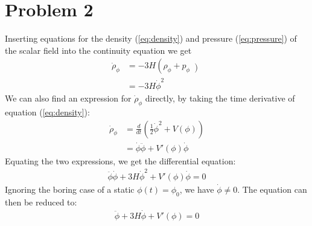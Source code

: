 \documentclass[reprint,english,notitlepage]{revtex4-1}  %
\begin{document}
\section{Problem 2}
Inserting equations for the density (\ref{eq:density}) and pressure
(\ref{eq:pressure}) of the scalar field into the continuity equation we get
\begin{align}
	\dot{\rho}_\phi &= -3H\left(\rho_\phi + p_\phi \left) \\
									&= -3H\dot{\phi}^2
\end{align}
We can also find an expression for $\dot{\rho}_\phi$ directly, by taking the
time derivative of equation (\ref{eq:density}):
\begin{align}
	\dot{\rho}_\phi &= \frac{d}{dt}\left(\frac{1}{2} \dot{\phi}^2 + V(\phi) \right)\\
					  			&= \dot{\phi} \ddot{\phi} + {V}'(\phi) \dot{\phi}
\end{align}
Equating the two expressions, we get the differential equation:
\begin{align}
	\ddot{\phi}\dot{\phi}  + 3H\dot{\phi}^2 + {V}'(\phi) \dot{\phi} = 0
\end{align}
Ignoring the boring case of a static $\phi(t)=\phi_0$, we have $\dot{\phi} \neq0$.
The equation can then be reduced to:
\begin{align}
	\ddot{\phi} + 3H\dot{\phi} + {V}'(\phi) = 0 \label{eq:phi_ddot}
\end{align}
\end{document}
